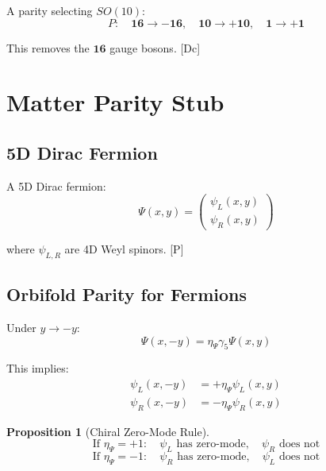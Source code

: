 \documentclass[11pt,a4paper]{article}
\newtheorem{proposition}[theorem]{Proposition}
\newcommand{\tagDc}{\textcolor{blue!50!black}{[Dc]}}
\newcommand{\tagP}{\textcolor{green!50!black}{[P]}}
\begin{document}
A parity selecting $SO(10)$:
\begin{equation}
\label{eq:e6-P-so10}
P: \quad \mathbf{16} \to -\mathbf{16}, \quad \mathbf{10} \to +\mathbf{10}, \quad \mathbf{1} \to +\mathbf{1}
\end{equation}

This removes the $\mathbf{16}$ gauge bosons. \tagDc

\section{Matter Parity Stub}
\label{app:matter}

\subsection{5D Dirac Fermion}

A 5D Dirac fermion:
\begin{equation}
\label{eq:5d-dirac}
\Psi(x, y) = \begin{pmatrix} \psi_L(x,y) \\ \psi_R(x,y) \end{pmatrix}
\end{equation}

where $\psi_{L,R}$ are 4D Weyl spinors. \tagP

\subsection{Orbifold Parity for Fermions}

Under $y \to -y$:
\begin{equation}
\label{eq:fermion-parity}
\Psi(x, -y) = \eta_\Psi \gamma_5 \Psi(x, y)
\end{equation}

This implies:
\begin{align}
\label{eq:psiL-parity}
\psi_L(x, -y) &= +\eta_\Psi \psi_L(x, y) \\
\label{eq:psiR-parity}
\psi_R(x, -y) &= -\eta_\Psi \psi_R(x, y)
\end{align}

\begin{proposition}[Chiral Zero-Mode Rule]
\label{prop:chiral}
\begin{equation}
\label{eq:chiral-rule}
\boxed{\text{If } \eta_\Psi = +1: \quad \psi_L \text{ has zero-mode}, \quad \psi_R \text{ does not}}
\end{equation}
\begin{equation}
\label{eq:chiral-rule2}
\boxed{\text{If } \eta_\Psi = -1: \quad \psi_R \text{ has zero-mode}, \quad \psi_L \text{ does not}}
\end{equation}
\end{proposition}
\end{document}
